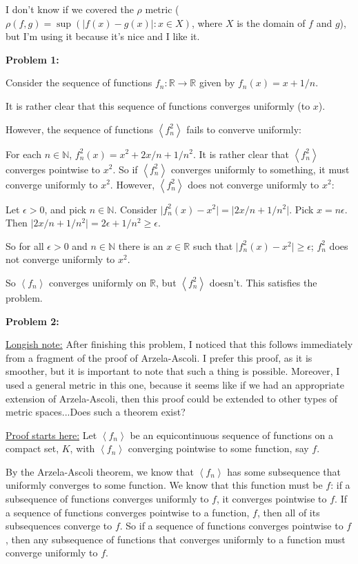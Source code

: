 \documentclass[a4paper,12pt]{article}
\newcommand{\tab}{\hspace{4mm}} %
\newcommand{\shunt}{\vspace{20mm}}
\newcommand{\absval}[1]{\lvert #1 \rvert}
\newcommand{\anbrack}[1]{\left\langle #1 \right\rangle}
\newcommand{\ep}{\epsilon}
\newcommand{\rh}{\rho}
\newcommand{\N}{\mathbb{N}}
\newcommand{\R}{\mathbb{R}}
\begin{document}
I don't know if we covered the $\rh$ metric ($\rh(f,g) = \sup(\absval{f(x)-g(x)}: x \in X)$, where $X$ is the domain of $f$ and $g$), but I'm using it because it's nice and I like it.

{\bf Problem 1:}

Consider the sequence of functions $f_n:\R \to \R $ given by $ f_n(x) =x + 1/n$.

It is rather clear that this sequence of functions converges uniformly (to $x$).

However, the sequence of functions $\anbrack{f_n^2}$ fails to converve uniformly:

\tab For each $n \in \N$, $f_n^2(x) = x^2 + 2x/n + 1/n^2$. It is rather clear that $\anbrack{f_n^2}$ converges pointwise to $x^2$. So if $\anbrack{f_n^2}$ converges uniformly to something, it must converge uniformly to $x^2$. However, $\anbrack{f_n^2}$ does not converge uniformly to $x^2$:

\tab \tab Let $\ep >0$, and pick $n \in \N$. Consider $\absval{f_n^2(x)- x^2} = \absval{2x/n + 1/n^2}$. Pick $x = n \ep$. Then $\absval{2x/n + 1/n^2} = 2\ep + 1/n^2 \geq \ep$.

\tab \tab So for all $\ep > 0$ and $n \in \N$ there is an $x \in \R$ such that $\absval{f_n^2(x) - x^2} \geq \ep$; $f_n^2$ does not converge uniformly to $x^2$.

So $\anbrack{f_n}$ converges uniformly on $\R$, but $\anbrack{f_n^2}$ doesn't. This satisfies the problem.

\shunt

{\bf Problem 2:}

\underline{Longish note:} After finishing this problem, I noticed that this follows immediately from a fragment of the proof of Arzela-Ascoli. I prefer this proof, as it is smoother, but it is important to note that such a thing is possible. Moreover, I used a general metric in this one, because it seems like if we had an appropriate extension of Arzela-Ascoli, then this proof could be extended to other types of metric spaces...Does such a theorem exist?

\underline{Proof starts here:} Let $\anbrack{f_n}$ be an equicontinuous sequence of functions on a compact set, $K$, with $\anbrack{f_n}$ converging pointwise to some function, say $f$.

By the Arzela-Ascoli theorem, we know that $\anbrack{f_n}$ has some subsequence that uniformly converges to some function. We know that this function must be $f$: if a subsequence of functions converges uniformly to $f$, it converges pointwise to $f$. If a sequence of functions converges pointwise to a function, $f$, then all of its subsequences converge to $f$. So if a sequence of functions converges pointwise to $f$, then any subsequence of functions that converges uniformly to a function must converge uniformly to $f$.
\end{document}
